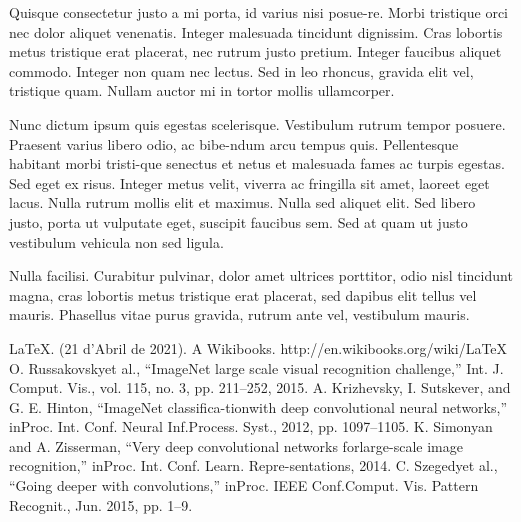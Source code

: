 ﻿\documentclass[10pt,a4paper,twocolumn,twoside]{article}
\begin{document}
Quisque consectetur justo a mi porta, id varius nisi posue-re. Morbi tristique orci nec dolor aliquet venenatis. Integer malesuada tincidunt dignissim. Cras lobortis metus tristique erat placerat, nec rutrum justo pretium. Integer faucibus aliquet commodo. Integer non quam nec lectus. Sed in leo rhoncus, gravida elit vel, tristique quam. Nullam auctor mi in tortor mollis ullamcorper. 

Nunc dictum ipsum quis egestas scelerisque. Vestibulum rutrum tempor posuere. Praesent varius libero odio, ac bibe-ndum arcu tempus quis. Pellentesque habitant morbi tristi-que senectus et netus et malesuada fames ac turpis egestas. Sed eget ex risus. Integer metus velit, viverra ac fringilla sit amet, laoreet eget lacus. Nulla rutrum mollis elit et maximus. Nulla sed aliquet elit. Sed libero justo, porta ut vulputate eget, suscipit faucibus sem. Sed at quam ut justo vestibulum vehicula non sed ligula. 

Nulla facilisi. Curabitur pulvinar, dolor amet ultrices porttitor, odio nisl tincidunt magna, cras lobortis metus tristique erat placerat, sed dapibus elit tellus vel mauris. Phasellus vitae purus gravida, rutrum ante vel, vestibulum mauris. 


\begin{thebibliography}{9}
 \LaTeX. (21 d'Abril de 2021). A Wikibooks. http://en.wikibooks.org/wiki/LaTeX
 O. Russakovskyet al., ``ImageNet large scale visual recognition challenge,'' Int. J. Comput. Vis., vol. 115, no. 3, pp. 211–252, 2015.
 A. Krizhevsky, I. Sutskever, and G. E. Hinton, ``ImageNet classifica-tionwith deep convolutional neural networks,'' inProc. Int. Conf. Neural Inf.Process. Syst., 2012, pp. 1097–1105.
 K. Simonyan and A. Zisserman, ``Very deep convolutional networks forlarge-scale image recognition,'' inProc. Int. Conf. Learn. Repre-sentations, 2014.
 C. Szegedyet al., ``Going deeper with convolutions,'' inProc. IEEE Conf.Comput. Vis. Pattern Recognit., Jun. 2015, pp. 1–9.
\end{thebibliography}
\end{document}
